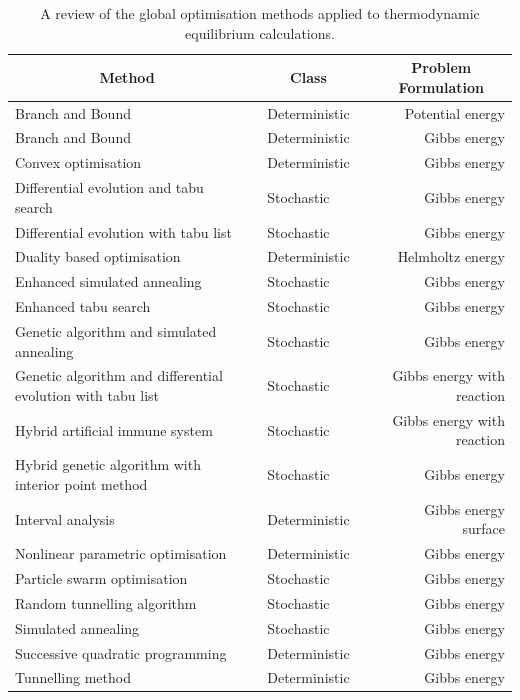 \begin{table}[htp]
	\caption{A review of the global optimisation methods applied to thermodynamic equilibrium calculations.}
	\centering
	\begin{tabular}{@{}p{} c l c r@{}}
	\toprule
	\multicolumn{1}{c}{\textbf{Method}} &\phantom{abc} & \multicolumn{1}{c}{\textbf{Class}} &\phantom{abc} & \multicolumn{1}{c}{\textbf{Problem Formulation}}\\
	\midrule
	Branch and Bound \cite{CHEUNG2002169} && Deterministic && Potential energy \\
	Branch and Bound \cite{Piro16} && Deterministic  && Gibbs energy \\
	Convex optimisation \cite{ROSSI20111226}&& Deterministic && Gibbs energy \\
	Differential evolution and tabu search \cite{SRINIVAS2007760} && Stochastic && Gibbs energy \\
	Differential evolution with tabu list \cite{Srinivas:2007aa} && Stochastic && Gibbs energy \\
	Duality based optimisation \cite{PEREIRA20101} && Deterministic && Helmholtz energy \\
	Enhanced simulated annealing \cite{ZHU20003451} && Stochastic && Gibbs energy \\
	Enhanced tabu search \cite{Teh03} && Stochastic && Gibbs energy \\
	Genetic algorithm and simulated annealing \cite{Rangaiah01} && Stochastic && Gibbs energy \\
	Genetic algorithm and differential evolution with tabu list \cite{Bonilla-Petriciolet:2011aa} && Stochastic && Gibbs energy with reaction \\
	Hybrid artificial immune system \cite{Lin:2007aa} && Stochastic && Gibbs energy with reaction \\
	Hybrid genetic algorithm with interior point method \cite{STAUDT2009585} && Stochastic && Gibbs energy \\
	Interval analysis \cite{Scurto:2003aa} && Deterministic && Gibbs energy surface \\
	Nonlinear parametric optimisation \cite{Chaikunchuensakun:2002aa} && Deterministic && Gibbs energy \\
	Particle swarm optimisation \cite{Bonilla09,Piro16} && Stochastic && Gibbs energy \\
	Random tunnelling algorithm \cite{Srinivas06} && Stochastic && Gibbs energy \\
	Simulated annealing \cite{Bonilla-Petriciolet:2009aa} && Stochastic && Gibbs energy \\
	Successive quadratic programming \cite{LUCIA20002557} && Deterministic && Gibbs energy \\
	Tunnelling method \cite{Nichita02,Nichita:2004aa} && Deterministic && Gibbs energy \\
	\bottomrule
	\end{tabular}
	\label{tab:globalopt}
\end{table}

